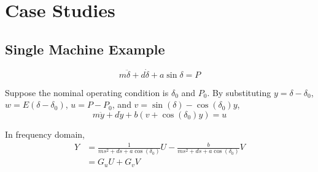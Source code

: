 \documentclass[journal]{IEEEtran}
\begin{document}
\section{Case Studies}
\subsection{Single Machine Example}
\begin{equation}
m\ddot{\delta}+d\dot{\delta}+a\sin\delta=P
\end{equation}

Suppose the nominal operating condition is $\delta_0$ and $P_0$. By substituting $y=\delta-\delta_0$, $w=E(\delta-\delta_0)$, $u=P-P_0$, and $v=\sin(\delta)-\cos(\delta_0)y$,
\begin{equation}
m\ddot{y}+d\dot{y}+b(v+\cos(\delta_0)y)=u
\end{equation}

In frequency domain,
\begin{equation}
\begin{aligned}
Y&=\frac{1}{ms^2+ds+a\cos(\delta_0)}U-\frac{b}{ms^2+ds+a\cos(\delta_0)}V \\
&=G_uU+G_vV
\end{aligned}
\end{equation}


\ifCLASSOPTIONcaptionsoff
\newpage
\fi



\nocite{*} 
\end{document}
